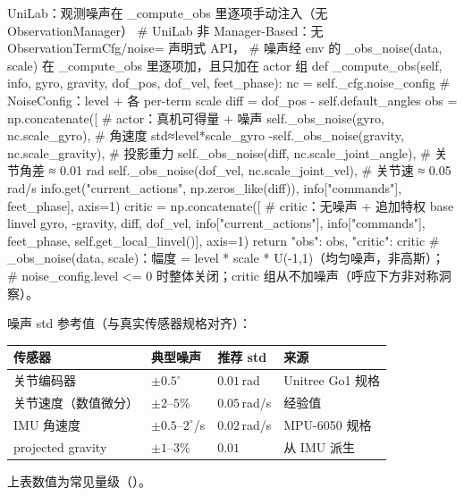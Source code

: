 \begin{codebox}[Python]{UniLab：观测噪声在 \_compute\_obs 里逐项手动注入（无 ObservationManager）}
# UniLab 非 Manager-Based：无 ObservationTermCfg/noise= 声明式 API，
# 噪声经 env 的 _obs_noise(data, scale) 在 _compute_obs 里逐项加，且只加在 actor 组
def _compute_obs(self, info, gyro, gravity, dof_pos, dof_vel, feet_phase):
    nc = self._cfg.noise_config           # NoiseConfig：level + 各 per-term scale
    diff = dof_pos - self.default_angles
    obs = np.concatenate([                # actor：真机可得量 + 噪声
        self._obs_noise(gyro, nc.scale_gyro),          # 角速度 std≈level*scale_gyro
        -self._obs_noise(gravity, nc.scale_gravity),   # 投影重力
        self._obs_noise(diff, nc.scale_joint_angle),   # 关节角差 ≈ 0.01 rad
        self._obs_noise(dof_vel, nc.scale_joint_vel),  # 关节速 ≈ 0.05 rad/s
        info.get("current_actions", np.zeros_like(diff)),
        info["commands"], feet_phase], axis=1)
    critic = np.concatenate([             # critic：无噪声 + 追加特权 base linvel
        gyro, -gravity, diff, dof_vel, info["current_actions"],
        info["commands"], feet_phase, self.get_local_linvel()], axis=1)
    return {"obs": obs, "critic": critic}
# _obs_noise(data, scale)：幅度 = level * scale * U(-1,1)（均匀噪声，非高斯）；
#   noise_config.level <= 0 时整体关闭；critic 组从不加噪声（呼应下方非对称洞察）。
\end{codebox}

噪声 std 参考值（与真实传感器规格对齐）：

\begin{center}
\small
\begin{tabular}{@{}llll@{}}
\toprule
传感器 & 典型噪声 & 推荐 std & 来源 \\
\midrule
关节编码器 & $\pm 0.5^\circ$ & $0.01$\,rad & Unitree Go1 规格 \\
关节速度（数值微分） & $\pm 2$--$5\%$ & $0.05$\,rad/s & 经验值 \\
IMU 角速度 & $\pm 0.5$--$2^\circ$/s & $0.02$\,rad/s & MPU-6050 规格 \\
projected gravity & $\pm 1$--$3\%$ & $0.01$ & 从 IMU 派生 \\
\bottomrule
\end{tabular}
\end{center}

\begin{finenote}
上表数值为常见量级（）。
\end{finenote}

